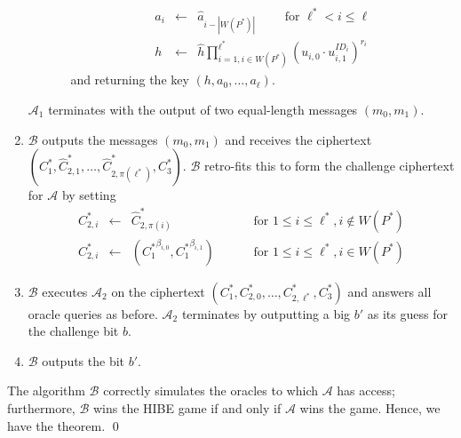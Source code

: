 \documentclass[10pt]{llncs}
\newcommand{\A}{\mathcal{A}}
\newcommand{\B}{\mathcal{B}}
\newcommand{\ID}{\mathit{ID}}
\begin{document}
\begin{enumerate}
\begin{itemize}
\begin{itemize}
\begin{displaymath}
\begin{array}{rcl}
            a_{i} &\gets& \hat{a}_{i-|W(P^{*})|} \qquad \mbox{ for } \ell^{*} <i\leq \ell\\
            h &\gets& \hat{h} \prod_{i=1, i\in W(P^{*})}^{\ell^{*}} (u_{i,0} \cdot u_{i,1}^{\ID_{i}})^{r_{i}}
            \end{array}
            \end{displaymath}
            and returning the key $(h,a_{0},\ldots,a_{\ell})$.
        \end{itemize}
        \end{itemize}
            $\A_{1}$ terminates with the output of two
            equal-length messages $(m_{0},m_{1})$.
        \item $\B$ outputs the messages $(m_{0},m_{1})$ and receives
        the ciphertext
        $(C^{*}_{1},\hat{C}^{*}_{2,1},\ldots,\hat{C}^{*}_{2,\pi(\ell^{*})},C^{*}_{3})$.
        $\B$ retro-fits this to form the challenge
        ciphertext for $\A$ by setting
                \begin{displaymath}
                \begin{array}{rcll}
                C^{*}_{2,i} &\gets& \hat{C}^{*}_{2,\pi(i)} & \qquad \mbox{ for } 1\leq i\leq \ell^{*}, i\notin W(P^{*})\\
                C^{*}_{2,i} &\gets& ({C^{*}_{1}}^{\beta_{i,0}},{C^{*}_{1}}^{\beta_{i,1}}) & \qquad \mbox{ for } 1\leq i\leq \ell^{*}, i\in W(P^{*})
                \end{array}
                \end{displaymath}
        \item $\B$ executes $\A_{2}$ on the ciphertext
                $(C^{*}_{1},C^{*}_{2,0},\ldots,C^{*}_{2,\ell^{*}},C^{*}_{3})$
                and answers all oracle queries as before.
                $\A_{2}$ terminates by outputting a big $b'$ as
                its guess for the challenge bit $b$.

    \item $\B$ outputs the bit $b'$.
\end{enumerate}
The algorithm $\B$ correctly simulates the oracles to which $\A$ has access; furthermore, $\B$ wins the HIBE game if and only if $\A$ wins the game. Hence, we have the theorem. \qed
\end{document}
